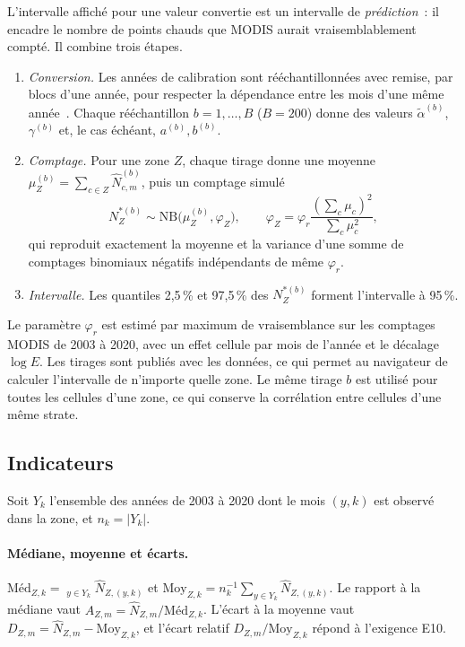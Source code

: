 \documentclass[11pt,a4paper]{article}
\DeclareMathOperator{\med}{m\acute{e}d}
\begin{document}
L'intervalle affiché pour une valeur convertie est un intervalle de \emph{prédiction}~: il encadre le nombre de points chauds que MODIS aurait vraisemblablement compté. Il combine trois étapes.
\begin{enumerate}
  \item \emph{Conversion.} Les années de calibration sont rééchantillonnées avec remise, par blocs d'une année, pour respecter la dépendance entre les mois d'une même année~\cite{kunsch1989}. Chaque rééchantillon $b = 1,\dots,B$ ($B=200$) donne des valeurs $\tilde\alpha^{(b)}$, $\gamma^{(b)}$ et, le cas échéant, $a^{(b)}, b^{(b)}$.
  \item \emph{Comptage.} Pour une zone $Z$, chaque tirage donne une moyenne $\mu_Z^{(b)} = \sum_{c\in Z}\hat N^{(b)}_{c,m}$, puis un comptage simulé
  \begin{equation}
    N_Z^{\ast(b)} \sim \mathrm{NB}\big(\mu_Z^{(b)}, \varphi_Z\big), \qquad \varphi_Z = \varphi_r \frac{\left(\sum_c \mu_c\right)^2}{\sum_c \mu_c^2},
  \end{equation}
  qui reproduit exactement la moyenne et la variance d'une somme de comptages binomiaux négatifs indépendants de même $\varphi_r$.
  \item \emph{Intervalle.} Les quantiles 2,5\,\% et 97,5\,\% des $N_Z^{\ast(b)}$ forment l'intervalle à 95\,\%.
\end{enumerate}
Le paramètre $\varphi_r$ est estimé par maximum de vraisemblance sur les comptages MODIS de 2003 à 2020, avec un effet cellule par mois de l'année et le décalage $\log E$. Les tirages sont publiés avec les données, ce qui permet au navigateur de calculer l'intervalle de n'importe quelle zone. Le même tirage $b$ est utilisé pour toutes les cellules d'une zone, ce qui conserve la corrélation entre cellules d'une même strate.

\subsection{Indicateurs}\label{sec:indicateurs}

Soit $Y_k$ l'ensemble des années de 2003 à 2020 dont le mois $(y,k)$ est observé dans la zone, et $n_k = |Y_k|$.

\paragraph{Médiane, moyenne et écarts.} $\text{Méd}_{Z,k} = \med_{y\in Y_k} \hat N_{Z,(y,k)}$ et $\mathrm{Moy}_{Z,k} = n_k^{-1}\sum_{y\in Y_k}\hat N_{Z,(y,k)}$. Le rapport à la médiane vaut $A_{Z,m} = \hat N_{Z,m}/\text{Méd}_{Z,k}$. L'écart à la moyenne vaut $D_{Z,m} = \hat N_{Z,m} - \mathrm{Moy}_{Z,k}$, et l'écart relatif $D_{Z,m}/\mathrm{Moy}_{Z,k}$ répond à l'exigence E10.
\end{document}
